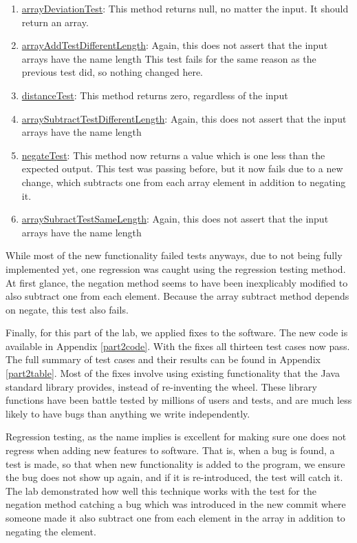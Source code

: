 \begin{enumerate}
  \item \underline{arrayDeviationTest}:
    This method returns null, no matter the input. It should return an array.
  \item \underline{arrayAddTestDifferentLength}:
    Again, this does not assert that the input arrays have the name length
    This test fails for the same reason as the previous test did, so nothing
    changed here.
  \item \underline{distanceTest}:
    This method returns zero, regardless of the input
  \item \underline{arraySubtractTestDifferentLength}:
    Again, this does not assert that the input arrays have the name length
  \item \underline{negateTest}:
    This method now returns a value which is one less than the expected output.
    This test was passing before, but it now fails due to a new change, which
    subtracts one from each array element in addition to negating it.
  \item \underline{arraySubractTestSameLength}:
    Again, this does not assert that the input arrays have the name length
\end{enumerate}

While most of the new functionality failed tests anyways, due to not being fully
implemented yet, one regression was caught using the regression testing method.
At first glance, the negation method seems to have been inexplicably modified to
also subtract one from each element. Because the array subtract method depends
on negate, this test also fails. 


Finally, for this part of the lab, we applied fixes to the software. The new
code is available in Appendix \ref{part2code}. With the fixes all thirteen test
cases now pass. The full summary of test cases and their results can be found in
Appendix \ref{part2table}. Most of the fixes involve using existing
functionality that the Java standard library provides, instead of re-inventing
the wheel. These library functions have been battle tested by millions of users
and tests, and are much less likely to have bugs than anything we write
independently.

Regression testing, as the name implies is excellent for making sure one does
not regress when adding new features to software. That is, when a bug is found, a
test is made, so that when new functionality is added to the program, we ensure
the bug does not show up again, and if it is re-introduced, the test will catch
it. The lab demonstrated how well this technique works with the test for the
negation method catching a bug which was introduced in the new commit where
someone made it also subtract one from each element in the array in addition to
negating the element.

